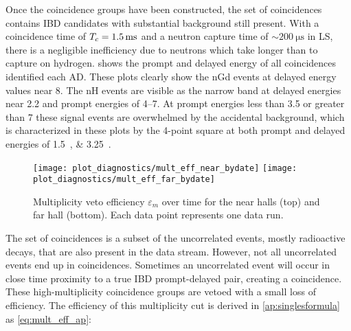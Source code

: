 
Once the coincidence groups have been constructed,
the set of  coincidences
contains IBD candidates
with substantial background still present.
With a coincidence time of $\tc=\SI{1.5}{\ms}$
and a neutron capture time of $\sim\SI{200}{\us}$ in LS,
there is a negligible inefficiency due to neutrons
which take longer than \tc{} to capture on hydrogen.
 shows the prompt and delayed energy
of all  coincidences identified each AD.
These plots clearly show the nGd events
at delayed energy values near \SI{8}{\mev}.
The nH events are visible as the narrow band at
delayed energies near \SI{2.2}{\mev}
and prompt energies of \SIrange{4}{7}{\mev}.
At prompt energies less than \SI{3.5}{\mev} or greater than \SI{7}{\mev}
these signal events are overwhelmed by the accidental background,
which is characterized in these plots by the 4-point square at both prompt and
delayed energies of \SIlist{1.5;3.25}{\mev}.

\begin{figure}
    \texttt{[image: plot\_diagnostics/mult\_eff\_near\_bydate]}
    \texttt{[image: plot\_diagnostics/mult\_eff\_far\_bydate]}
    \caption{
        Multiplicity veto efficiency $\varepsilon_m$ over time for
        the near halls (top) and far hall (bottom).
        Each data point represents one data run.
    }
    \label{fig:mult_eff}
\end{figure}
The set of  coincidences is a subset
of the uncorrelated events, mostly radioactive decays,
that are also present in the data stream.
However, not all uncorrelated events end up in  coincidences.
Sometimes an uncorrelated event will occur in close time proximity to
a true IBD prompt-delayed pair, creating a  coincidence.
These high-multiplicity coincidence groups are vetoed
with a small loss of efficiency.
The efficiency of this multiplicity cut is derived in \cref{ap:singlesformula} as
\cref{eq:mult_eff_ap}:

